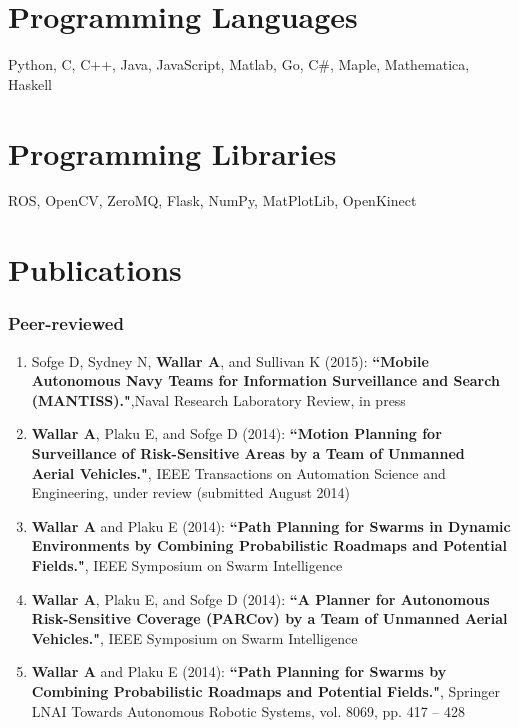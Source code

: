 \documentclass[line,margin]{cv}
\begin{document}
\begin{resume}
\section{Programming Languages}
    Python, C, C++, Java, JavaScript, Matlab, Go, C\#, Maple,
    Mathematica, Haskell

\section{Programming Libraries}
    ROS, OpenCV, ZeroMQ, Flask, NumPy, MatPlotLib, OpenKinect

\section{Publications}

\subsubsection{Peer-reviewed}

\begin{enumerate}

    \item Sofge D, Sydney N, \textbf{Wallar A}, and Sullivan K (2015):
        \textbf{``Mobile Autonomous Navy Teams for Information Surveillance
        and Search (MANTISS)."},Naval Research Laboratory Review, in press

    \item \textbf{Wallar A}, Plaku E, and Sofge D (2014): \textbf{``Motion
        Planning for Surveillance of Risk-Sensitive Areas by a Team of
        Unmanned Aerial Vehicles."}, IEEE Transactions on Automation Science
        and Engineering, under review (submitted August 2014)

    \item \textbf{Wallar A} and Plaku E (2014): \textbf{``Path Planning for
        Swarms in Dynamic Environments by Combining Probabilistic Roadmaps
        and Potential Fields."}, IEEE Symposium on Swarm Intelligence

    \item \textbf{Wallar A}, Plaku E, and Sofge D (2014): \textbf{``A Planner
        for Autonomous Risk-Sensitive Coverage (PARCov) by a Team of Unmanned
        Aerial Vehicles."}, IEEE Symposium on Swarm Intelligence

    \item \textbf{Wallar A} and Plaku E (2014): \textbf{``Path Planning for
        Swarms by Combining Probabilistic Roadmaps and Potential Fields."},
        Springer LNAI Towards Autonomous Robotic Systems, vol. 8069,
        pp. 417 -- 428


\end{enumerate}
\end{resume}
\end{document}
